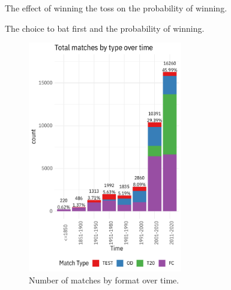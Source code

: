 \documentclass[12pt, letterpaper]{article}
\begin{document}
\clearpage

\begin{table}[htb!]
\centering
\caption{The effect of winning the toss on the probability of winning.}

\label{table:reduced_form}
\end{table}

\clearpage

\begin{table}[htb!]
\scriptsize
\centering
\caption{The choice to bat first and the probability of winning.}

\label{table:iv_table}
\end{table}

\clearpage

\begin{figure}[tbh]
  \centering
  \includegraphics[width=0.6\textwidth,keepaspectratio]{output/matchcounts.pdf}
  \caption{Number of matches by format over time.}
  \label{fig:timeseries_decomp}
\end{figure}

\clearpage
    
\end{document}

